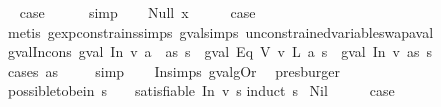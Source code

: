 \begin{isabellebody}
\ \isamarkupfalse%
\ {\isacharquery}case\isanewline
\ \ \ \ \isamarkupfalse%
\ simp\isanewline
{}\isamarkupfalse%
\isanewline
\ \ \isamarkupfalse%
\ {\isacharparenleft}Null\ x{\isacharparenright}\isanewline
\ \ \isamarkupfalse%
\ \isamarkupfalse%
\ {\isacharquery}case\isanewline
\ \ \ \ \isamarkupfalse%
\ {\isacharparenleft}metis\ gexp{\isacharunderscore}constrains{\isachardot}simps{\isacharparenleft}{}{\isacharparenright}\ gval{\isachardot}simps{\isacharparenleft}{}{\isacharparenright}\ unconstrained{\isacharunderscore}variable{\isacharunderscore}swap{\isacharunderscore}aval{\isacharparenright}\isanewline
{}\isamarkupfalse%
%
\endisatagproof
{\isafoldproof}%
%
\isadelimproof
\isanewline
%
\endisadelimproof
\isanewline
{}\isamarkupfalse%
\ gval{\isacharunderscore}In{\isacharunderscore}cons{\isacharcolon}\ {\isachardoublequoteopen}gval\ {\isacharparenleft}In\ v\ {\isacharparenleft}a\ {\isacharhash}\ as{\isacharparenright}{\isacharparenright}\ s\ {\isacharequal}\ {\isacharparenleft}gval\ {\isacharparenleft}Eq\ {\isacharparenleft}V\ v{\isacharparenright}\ {\isacharparenleft}L\ a{\isacharparenright}{\isacharparenright}\ s\ {\isasymor}\isactrlsub {\isacharquery}\ gval\ {\isacharparenleft}In\ v\ as{\isacharparenright}\ s{\isacharparenright}{\isachardoublequoteclose}\isanewline
%
\isadelimproof
\ \ %
\endisadelimproof
%
\isatagproof
{}\isamarkupfalse%
\ {\isacharparenleft}cases\ as{\isacharparenright}\isanewline
\ \ \ \isamarkupfalse%
\ simp\isanewline
\ \ \isamarkupfalse%
\ In{\isachardot}simps{\isacharparenleft}{}{\isacharparenright}\ gval{\isacharunderscore}gOr\ \isamarkupfalse%
\ presburger%
\endisatagproof
{\isafoldproof}%
%
\isadelimproof
\isanewline
%
\endisadelimproof
\isanewline
{}\isamarkupfalse%
\ possible{\isacharunderscore}to{\isacharunderscore}be{\isacharunderscore}in{\isacharcolon}\ {\isachardoublequoteopen}s\ {\isasymnoteq}\ {\isacharbrackleft}{\isacharbrackright}\ {\isasymLongrightarrow}\ satisfiable\ {\isacharparenleft}In\ v\ s{\isacharparenright}{\isachardoublequoteclose}\isanewline
%
\isadelimproof
%
\endisadelimproof
%
\isatagproof
{}\isamarkupfalse%
{\isacharparenleft}induct\ s{\isacharparenright}\isanewline
{}\isamarkupfalse%
\ Nil\isanewline
\ \ \isamarkupfalse%
\ \isamarkupfalse%
\ {\isacharquery}case\ \isamarkupfalse%

\end{isabellebody}
